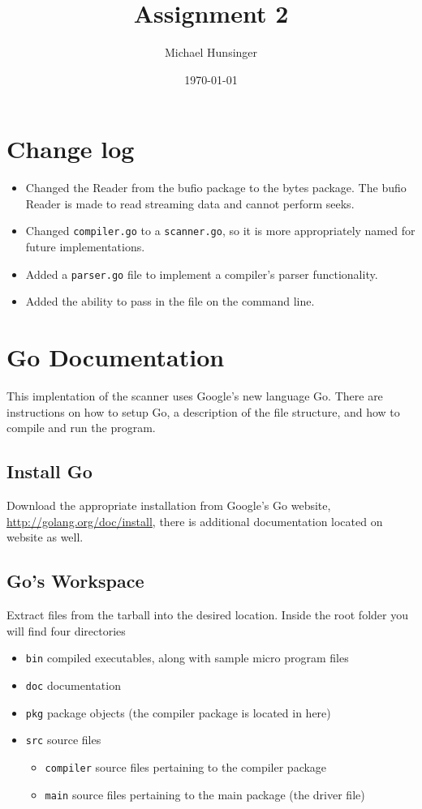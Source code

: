 \documentclass[a4paper]{article}
\author{Michael Hunsinger}
\date{\today}
\title{Assignment 2}
\begin{document}
\maketitle

\section{Change log}
\label{sec-1}
\begin{itemize}
\item Changed the Reader from the bufio package to the bytes package. The
bufio Reader is made to read streaming data and cannot perform seeks.
\item Changed \verb~compiler.go~ to a \verb~scanner.go~, so it is more appropriately
named for future implementations.
\item Added a \verb~parser.go~ file to implement a compiler's parser functionality.
\item Added the ability to pass in the file on the command line.
\end{itemize}

\section{Go Documentation}
\label{sec-2}
This implentation of the scanner uses Google's new language Go. There are
instructions on how to setup Go, a description of the file structure, and
how to compile and run the program.

\subsection{Install Go}
\label{sec-2-1}
Download the appropriate installation from Google's Go website,
\url{http://golang.org/doc/install}, there is additional documentation located
on website as well.

\subsection{Go's Workspace}
\label{sec-2-2}
Extract files from the tarball into the desired location. Inside the root
folder you will find four directories
\begin{itemize}
\item \verb~bin~ compiled executables, along with sample micro program files
\item \verb~doc~ documentation
\item \verb~pkg~ package objects (the compiler package is located in here)
\item \verb~src~ source files
\begin{itemize}
\item \verb~compiler~ source files pertaining to the compiler package
\item \verb~main~ source files pertaining to the main package (the driver file)
\end{itemize}
\end{itemize}
\end{document}

